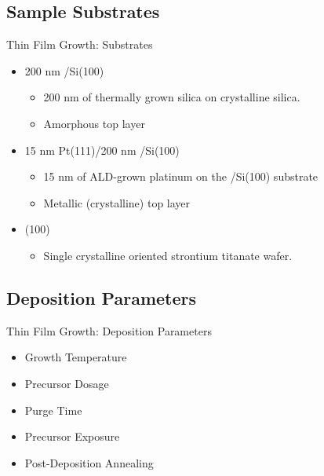 \documentclass[professionalfont]{beamer}
\begin{document}
\subsection{Sample Substrates}
\begin{frame}{Thin Film Growth: Substrates}
\vfill
\begin{itemize}
	\large
	\item 200 nm /Si(100)
	\begin{itemize}
		\item 200 nm of thermally grown silica on crystalline silica.
		\item Amorphous top layer
	\end{itemize}
	\vspace{1.5em}
	\item 15 nm Pt(111)/200 nm /Si(100)
	\begin{itemize}
		\item 15 nm of ALD-grown platinum on the /Si(100) substrate
		\item Metallic (crystalline) top layer
	\end{itemize}
	\vspace{1.5em}
	\item {}(100)
	\begin{itemize}
		\item Single crystalline oriented strontium titanate wafer.
	\end{itemize}
	\vspace{1.5em}
\end{itemize}
\vfill
\end{frame}

\subsection{Deposition Parameters}
\begin{frame}{Thin Film Growth: Deposition Parameters}
\begin{itemize}
	\large
	\item Growth Temperature
	\vspace{1.5em}
	\item Precursor Dosage
	\vspace{1.5em}
	\item Purge Time
	\vspace{1.5em}
	\item Precursor Exposure
	\vspace{1.5em}
	\item Post-Deposition Annealing
	\end{itemize}
\end{frame}
\end{document}

